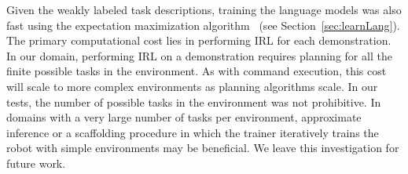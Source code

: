 \documentclass[conference]{IEEEtran}
\begin{document}
Given the weakly labeled task descriptions, training the language models was also fast using the expectation maximization algorithm~\cite{dempster77} (see Section~\ref{sec:learnLang}). The primary computational cost lies in performing IRL for each demonstration. In our domain, performing IRL on a demonstration requires planning for all the finite possible tasks in the environment. As with command execution, this cost will scale to more complex environments as planning algorithms scale. In our tests, the number of possible tasks in the environment was not prohibitive. In domains with a very large number of tasks per environment, approximate inference or a scaffolding procedure in which the trainer iteratively trains the robot with simple environments may be beneficial. We leave this investigation for future work. 
\end{document}
